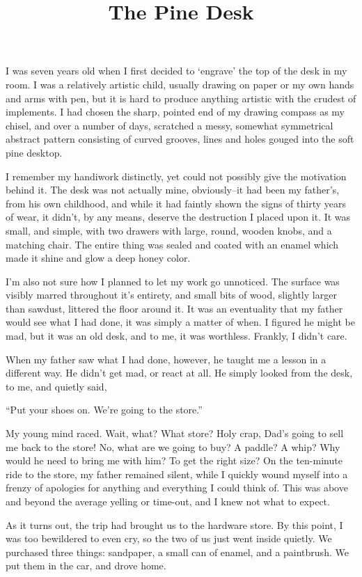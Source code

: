 \documentclass[letterpaper]{article}
\title{The Pine Desk}
\date{}
\begin{document}
	\maketitle
	\onehalfspacing
	I was seven years old when I first decided to `engrave' the top of the desk in my room. I was a relatively artistic child, usually drawing on paper or my own hands and arms with pen, but it is hard to produce anything artistic with the crudest of implements. I had chosen the sharp, pointed end of my drawing compass as my chisel, and over a number of days, scratched a messy, somewhat symmetrical abstract pattern consisting of curved grooves, lines and holes gouged into the soft pine desktop.

	I remember my handiwork distinctly, yet could not possibly give the motivation behind it. The desk was not actually mine, obviously--it had been my father's, from his own childhood, and while it had faintly shown the signs of thirty years of wear, it didn't, by any means, deserve the destruction I placed upon it. It was small, and simple, with two drawers with large, round, wooden knobs, and a matching chair. The entire thing was sealed and coated with an enamel which made it shine and glow a deep honey color.

	I'm also not sure how I planned to let my work go unnoticed. The surface was visibly marred throughout it's entirety, and small bits of wood, slightly larger than sawdust, littered the floor around it. It was an eventuality that my father would see what I had done, it was simply a matter of when. I figured he might be mad, but it was an old desk, and to me, it was worthless. Frankly, I didn't care.

	When my father saw what I had done, however, he taught me a lesson in a different way. He didn't get mad, or react at all. He simply looked from the desk, to me, and quietly said,

	``Put your shoes on. We're going to the store.''

	My young mind raced. Wait, what? What store? Holy crap, Dad's going to sell me back to the store! No, what are we going to buy? A paddle? A whip? Why would he need to bring me with him? To get the right size? On the ten-minute ride to the store, my father remained silent, while I quickly wound myself into a frenzy of apologies for anything and everything I could think of. This was above and beyond the average yelling or time-out, and I knew not what to expect.

	As it turns out, the trip had brought us to the hardware store. By this point, I was too bewildered to even cry, so the two of us just went inside quietly. We purchased three things: sandpaper, a small can of enamel, and a paintbrush. We put them in the car, and drove home.
\end{document}

